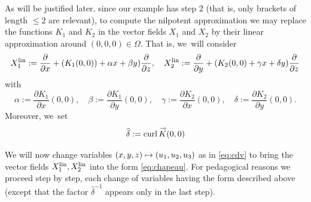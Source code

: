\documentclass[JEP,XML,SOM,Unicode,published]{cedram}
\newcommand\mto{\mathchoice{\longmapsto}{\mapsto}{\mapsto}{\mapsto}}
\newcommand{\lin}{\textup{lin}}
\DeclareMathOperator{\curl}{curl}
\renewcommand{\vec}[1]
{\overset{\,{\raisebox{-2pt}{$\scriptstyle\to$}}}{#1}}
\theoremstyle{definition}
\newcommand{\1}{\mathbbm{1}}
\begin{document}
As will be justified later, since our example has step 2 (that is, only brackets of length $\leq 2$ are relevant), to compute the nilpotent approximation we may replace the functions $K_1$ and $K_2$ in the vector fields $X_1$ and $X_2$ by their linear approximation around $(0,0,0)\in\Omega$. That is, we~will consider
\[
X_1^\lin := \frac{\partial}{\partial x} + (K_1(0,0)) + \alpha x + \beta y) \frac{\partial}{\partial z},\quad
X_2^\lin := \frac{\partial}{\partial y} +(K_2 (0,0) + \gamma x + \delta y) \frac{\partial}{\partial z}
\]
with
\[
\alpha := \frac{\partial K_1}{\partial x} (0,0),
\quad
\beta := \frac{\partial K_1}{\partial y} (0,0),
\quad
\gamma := \frac{\partial K_2}{\partial x} (0,0),
\quad
\delta := \frac{\partial K_2}{\partial y} (0,0).
\]
Moreover, we~set
\[
\widehat \delta := \curl \vec K (0,0)
\]

We will now change variables $(x,y,z)\mto (u_1,u_2,u_3)$ as in \eqref{eq:cdv} to bring the vector fields $X_1^\lin, X_2^\lin$ into the form \eqref{eq:chapeau}. For pedagogical reasons we proceed step by step, each change of variables having the form described above (except that the factor $\widehat\delta^{-1}$ appears only in the last step).
\end{document}
